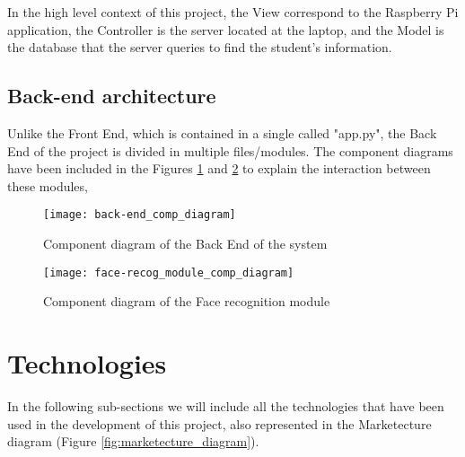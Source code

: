 In the high level context of this project, the View correspond to the Raspberry Pi application, the Controller is the server located at the laptop, and the Model is the database that the server queries to find the student's information. 

	\subsection{Back-end architecture}
	Unlike the Front End, which is contained in a single called "app.py", the Back End of the project is divided in multiple files/modules. The component diagrams have been included in the Figures \ref{fig:back_comp_diagram} and \ref{fig:face_recog_comp_diagram} to explain the interaction between these modules, 

	\clearpage

	\begin{figure}[!ht]
		\centering
		\texttt{[image: back-end\_comp\_diagram]}
		\caption{Component diagram of the Back End of the system}
		\label{fig:back_comp_diagram}
	\end{figure}	

	\clearpage

	\begin{figure}[!ht]
		\centering
		\texttt{[image: face-recog\_module\_comp\_diagram]}
		\caption{Component diagram of the Face recognition module}
		\label{fig:face_recog_comp_diagram}
	\end{figure}	



                                                                                                 


\section{Technologies}
\label{sec:techs}
In the following sub-sections we will include all the technologies that have been used in the development of this project, also represented in the Marketecture diagram (Figure \ref{fig:marketecture_diagram}).

